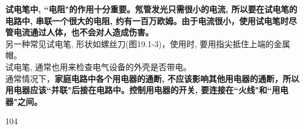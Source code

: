 \documentclass[UTF8]{ctexart}
\begin{document}
\textbf{试电笔中, ``电阻"的作用十分重要。氖管发光只需很小的电流, 所以要在试电笔的电路中, 串联一个很大的电阻, 约有一百万欧姆。由于电流很小，使用试电笔时尽管电流通过人体，也不会对人造成伤害。} \\

另一种常见试电笔, 形状如螺丝刀(图19.1-3)，使用时, 要用指尖抵住上端的金属帽。 \\

试电笔, 通常也用来检查电气设备的外壳是否带电。 \\

通常情况下，\textbf{家庭电路中各个用电器的通断, 不应该影响其他用电器的通断，所以用电器应该``并联"后接在电路中。控制用电器的开关, 要连接在``火线"和``用电器"之间。}



	
104
	
	
	
	
	
	
	
	
	
	
	
	
	
	
	
	
	
	
	
	
		

	


	
	
	
	
	
	
	
	
	
	
	
	
\end{document}

